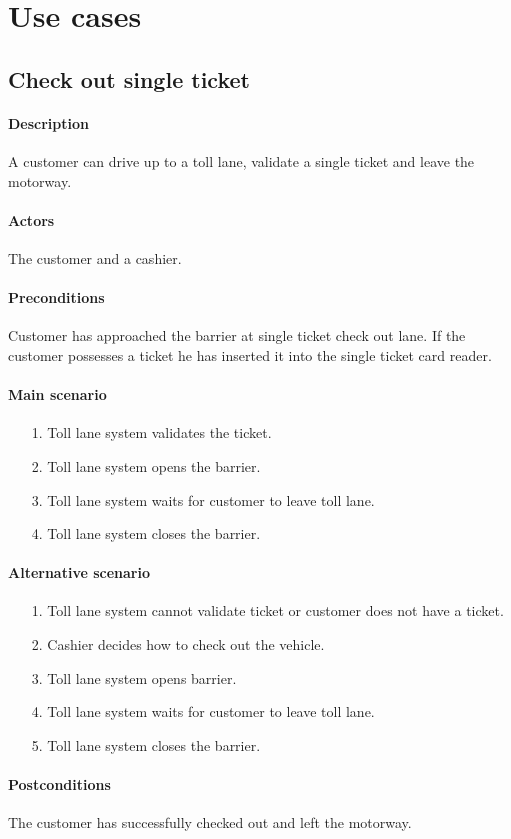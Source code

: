 \documentclass{report}
\begin{document}
\section{Use cases}
\subsection{Check out single ticket}
\paragraph{Description}
A customer can drive up to a toll lane, validate a single ticket and leave the motorway. 
\paragraph{Actors}
The customer and a cashier.
\paragraph{Preconditions}
Customer has approached the barrier at single ticket check out lane. If the customer possesses a ticket he has inserted it into the single ticket card reader. 
\paragraph{Main scenario}
\begin{enumerate}
\item[1.] Toll lane system validates the ticket. 
\item[2.] Toll lane system opens the  barrier.
\item[3.] Toll lane system waits for customer to leave toll lane.
\item[4.] Toll lane system closes the barrier.
\end{enumerate}
\paragraph{Alternative scenario}
\begin{enumerate}
\item[1.] Toll lane system cannot validate ticket or customer does not have a ticket.
\item[2.] Cashier decides how to check out the vehicle.
\item[3.] Toll lane system opens barrier.
\item[4.] Toll lane system waits for customer to leave toll lane.
\item[5.] Toll lane system closes the barrier.
\end{enumerate}
\paragraph{Postconditions}
The customer has successfully checked out and left the motorway.
\end{document}
